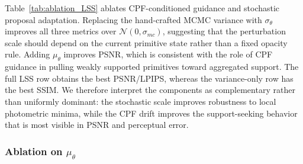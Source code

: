 \documentclass[lettersize,journal]{IEEEtran}
\begin{document}
\begin{table}[h]
    \centering
    \caption{Ablation studies of LSS parameterization on MatrixCity~\cite{matrixcity}. Best results are highlighted in bold.}
    \label{tab:ablation_LSS}
\end{table}

Table~\ref{tab:ablation_LSS} ablates CPF-conditioned guidance and stochastic proposal adaptation. Replacing the hand-crafted MCMC variance with $\sigma_{\theta}$ improves all three metrics over $\mathcal{N}(0,\sigma_{mc})$, suggesting that the perturbation scale should depend on the current primitive state rather than a fixed opacity rule. Adding $\mu_{\theta}$ improves PSNR, which is consistent with the role of CPF guidance in pulling weakly supported primitives toward aggregated support. The full LSS row obtains the best PSNR/LPIPS, whereas the variance-only row has the best SSIM. We therefore interpret the components as complementary rather than uniformly dominant: the stochastic scale improves robustness to local photometric minima, while the CPF drift improves the support-seeking behavior that is most visible in PSNR and perceptual error.

\subsubsection{Ablation on \texorpdfstring{$\mu_{\theta}$}{mu-theta}}
\end{document}
